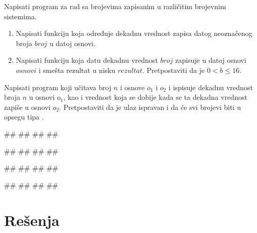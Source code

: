 \begin{Exercise}[difficulty=1, label=NIS_31] 
Napisati program za rad sa brojevima zapisanim u različitim brojevnim sistemima.
\begin{enumerate}
\item Napisati funkciju  koja
određuje dekadnu vrednost zapisa datog neoznačenog broja $broj$ u datoj osnovi. 
\item Napisati funkciju  
koja datu dekadnu vrednost $broj$ zapisuje u datoj osnovi $osnovi$ i smešta rezultat u nisku $rezultat$. 
Pretpostaviti da je $0 < b \leq 16$.  
\end{enumerate}

Napisati program koji učitava broj $n$ i osnove $o_1$ i $o_2$ i ispisuje dekadnu vrednost broja $n$ u osnovi $o_1$, kao i
vrednost koja se dobije kada se ta dekadna vrednost zapiše u osnovi $o_2$.
Pretpostaviti da je ulaz ispravan i da će svi brojevi biti u opsegu tipa . 

\begin{miditest}
\begin{upotreba}{1}
#\naslovInt#
##
##
##
\end{upotreba}
\end{miditest}
\begin{miditest}
\begin{upotreba}{2}
#\naslovInt#
##
##
##
\end{upotreba}
\end{miditest}

\begin{miditest}
\begin{upotreba}{3}
#\naslovInt#
##
##
##
\end{upotreba}
\end{miditest}
\begin{miditest}
\begin{upotreba}{4}
#\naslovInt#
##
##
##
\end{upotreba}
\end{miditest}
\end{Exercise}
\ifresenja
\begin{Answer}[ref=NIS_31]
\end{Answer}
\fi

\ifresenja
\section{Rešenja}
\shipoutAnswer
\fi

